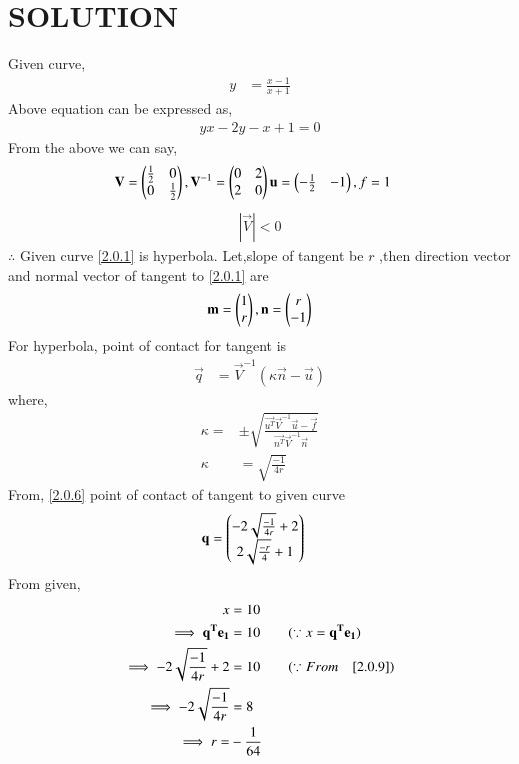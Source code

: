 \documentclass[journal,12pt,twocolumn]{IEEEtran}
\begin{document}
\section{SOLUTION}
Given curve,
\begin{align}
y&=\frac{{x-1}}{{x+1}} \label{2.0.1}
\end{align}
Above equation can be expressed as,
\begin{align}
yx-2y-x+1 =0
\end{align}
From the above we can say,
\begin{align}
\vec{V}&=\myvec{\frac{1}{2} & 0 \\ 0 & \frac{1}{2}},\vec{V}^{-1}=\myvec{0&2\\2&0}\vec{u}=\myvec{-\frac{1}{2}&-1},
f =1
\end{align}
\begin{align}
 |\vec{V}| < 0
\end{align}
$\therefore $ Given curve \eqref{2.0.1} is hyperbola.
Let,slope of tangent be $r$ ,then direction vector and normal vector of tangent to \eqref{2.0.1} are
\begin{align}
    \vec{m}= \myvec{1\\r},\vec{n}=\myvec{r\\-1} \label{2.0.5}
\end{align}
For hyperbola, point of contact for tangent is
\begin{align}
\vec{q}&=\vec{V}^{-1}(\kappa\vec{n}-\vec{u})\label{2.0.6}
\end{align}
where,
\begin{align}
\kappa=&\pm \sqrt{\frac{\vec{u^T}\vec{V}^{-1}\vec{u}-\vec{f}}{\vec{n^T}\vec{V}^{-1}\vec{n}}}\\
\kappa&=\sqrt{\frac{-1}{4r}} \label{2.0.9}
\end{align}
From, \eqref{2.0.6} point of contact of tangent to given curve
\begin{align}
\vec{q} &= \myvec{-2\sqrt{\frac{-1}{4r}}+2\\2\sqrt{\frac{-r}{4}}+1}\label{2.0.9}
\end{align}
From given,
\begin{align}
x&=10\\
\implies \vec{q^T}\vec{e_1}&=10\quad \quad (\because x =\vec{q^T}\vec{e_1} )\\
\implies-2\sqrt{\frac{-1}{4r}}+2 &= 10\quad\quad(\because From \quad \eqref{2.0.9})\\
\implies -2\sqrt{\frac{-1}{4r}}&=8\\
\implies r=&-\frac{1}{64}
\end{align}
\end{document}
